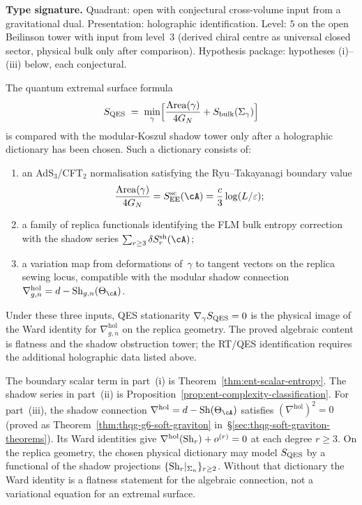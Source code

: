 \begin{conjecture}
\label{conj:ent-qes}
\textbf{Type signature.}  Quadrant: open with conjectural cross-volume
input from a gravitational dual.  Presentation: holographic
identification.  Level: $5$ on the open Beilinson tower with input
from level~$3$ (derived chiral centre as universal closed sector,
physical bulk only after comparison).  Hypothesis package:
hypotheses (i)--(iii) below, each conjectural.

The quantum extremal surface formula
\begin{equation}\label{eq:ent-qes-formula}
S_{\mathrm{QES}}
\;=\;
\min_\gamma\Bigl[
\frac{\mathrm{Area}(\gamma)}{4G_N}
+ S_{\mathrm{bulk}}(\Sigma_\gamma)
\Bigr]
\end{equation}
is compared with the modular-Koszul shadow tower only after a
holographic dictionary has been chosen.  Such a dictionary consists
of:
\begin{enumerate}[label=\textup{(\roman*)}]
\item an AdS$_3$/CFT$_2$ normalisation satisfying the
 Ryu--Takayanagi boundary value
 \[
 \frac{\mathrm{Area}(\gamma)}{4G_N}
 =S_{\EE}^{\mathrm{sc}}(\cA)
 =\frac{c}{3}\log(L/\varepsilon);
 \]

\item a family of replica functionals identifying the FLM bulk
 entropy correction with the shadow series
 $\sum_{r\ge3}\delta S_r^{\mathrm{sh}}(\cA)$;

\item a variation map from deformations of~$\gamma$ to tangent
 vectors on the replica sewing locus, compatible with the modular
 shadow connection
 $\nabla^{\mathrm{hol}}_{g,n}=d-\Sh_{g,n}(\Theta_\cA)$.
\end{enumerate}
Under these three inputs, QES stationarity
$\nabla_\gamma S_{\mathrm{QES}}=0$ is the physical image of the Ward identity
for $\nabla^{\mathrm{hol}}_{g,n}$ on the replica geometry.  The
proved algebraic content is flatness and the shadow obstruction
tower; the RT/QES identification requires the additional
holographic data listed above.
\end{conjecture}

\begin{remark}
The boundary scalar term in part~(i) is
Theorem~\ref{thm:ent-scalar-entropy}.  The shadow series in part~(ii)
is Proposition~\ref{prop:ent-complexity-classification}.  For
part~(iii), the shadow connection
$\nabla^{\mathrm{hol}} = d - \Sh(\Theta_\cA)$ satisfies
$(\nabla^{\mathrm{hol}})^2 = 0$ (proved as Theorem~\ref{thm:thqg-g6-soft-graviton}
in~\S\ref{sec:thqg-soft-graviton-theorems}).
Its Ward identities give
$\nabla^{\mathrm{hol}}(\mathrm{Sh}_r) + o^{(r)} = 0$
at each degree $r \ge 3$. On the replica geometry,
the chosen physical dictionary may model $S_{\mathrm{QES}}$ by a functional of
the shadow projections
$\{\mathrm{Sh}_r|_{\Sigma_n}\}_{r \ge 2}$.  Without that dictionary the Ward
identity is a flatness statement for the algebraic connection, not a
variational equation for an extremal surface.
\end{remark}


